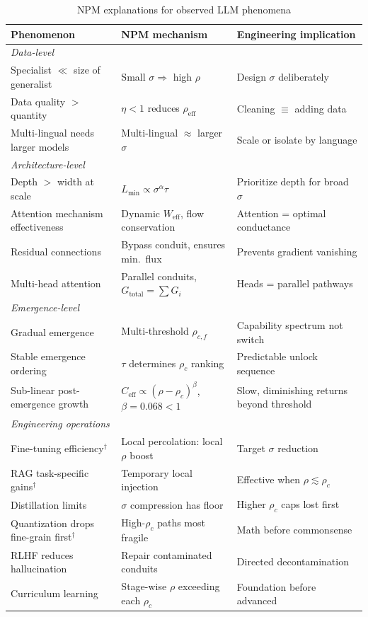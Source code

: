 \documentclass[11pt,a4paper]{article}
\newcommand{\Weff}{W_{\text{eff}}}
\newcommand{\Ceff}{C_{\text{eff}}}
\begin{document}
\begin{table}[h]
\centering
\caption{NPM explanations for observed LLM phenomena}
\label{tab:phenomena}
\small
\begin{tabular}{p{4.5cm}p{4.5cm}p{4cm}}
\toprule
\textbf{Phenomenon} & \textbf{NPM mechanism} & \textbf{Engineering implication} \\
\midrule
\multicolumn{3}{l}{\textit{Data-level}} \\
Specialist $\ll$ size of generalist & Small $\sigma \Rightarrow$ high $\rho$ & Design $\sigma$ deliberately \\
Data quality $>$ quantity & $\eta < 1$ reduces $\rho_{\text{eff}}$ & Cleaning $\equiv$ adding data \\
Multi-lingual needs larger models & Multi-lingual $\approx$ larger $\sigma$ & Scale or isolate by language \\
\midrule
\multicolumn{3}{l}{\textit{Architecture-level}} \\
Depth $>$ width at scale & $L_{\min} \propto \sigma^\alpha \tau$ & Prioritize depth for broad $\sigma$ \\
Attention mechanism effectiveness & Dynamic $\Weff$, flow conservation & Attention = optimal conductance \\
Residual connections & Bypass conduit, ensures min.\ flux & Prevents gradient vanishing \\
Multi-head attention & Parallel conduits, $G_{\text{total}} = \sum G_i$ & Heads = parallel pathways \\
\midrule
\multicolumn{3}{l}{\textit{Emergence-level}} \\
Gradual emergence & Multi-threshold $\rho_{c,f}$ & Capability spectrum not switch \\
Stable emergence ordering & $\tau$ determines $\rho_c$ ranking & Predictable unlock sequence \\
Sub-linear post-emergence growth & $\Ceff \propto (\rho-\rho_c)^\beta$, $\beta = 0.068 < 1$ & Slow, diminishing returns beyond threshold \\
\midrule
\multicolumn{3}{l}{\textit{Engineering operations}} \\
Fine-tuning efficiency$^\dagger$ & Local percolation: local $\rho$ boost & Target $\sigma$ reduction \\
RAG task-specific gains$^\dagger$ & Temporary local injection & Effective when $\rho \lesssim \rho_c$ \\
Distillation limits & $\sigma$ compression has floor & Higher $\rho_c$ caps lost first \\
Quantization drops fine-grain first$^\dagger$ & High-$\rho_c$ paths most fragile & Math before commonsense \\
RLHF reduces hallucination & Repair contaminated conduits & Directed decontamination \\
Curriculum learning & Stage-wise $\rho$ exceeding each $\rho_c$ & Foundation before advanced \\
\bottomrule
\end{tabular}
\end{table}
\end{document}
